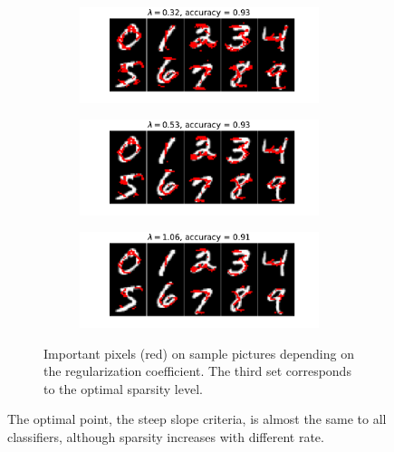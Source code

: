 \documentclass{article}
\begin{document}
\begin{figure}[t!]
\begin{subfigure}[t!]{0.40\textwidth}
\begin{subfigure}{\textwidth}
        \end{subfigure}
        \begin{subfigure}{\textwidth}
            \centering
            \includegraphics[width=\textwidth]{images/pixels_with_background_1}
        \end{subfigure}
        \begin{subfigure}{\textwidth}
            \centering
            \includegraphics[width=\textwidth]{images/pixels_with_background_2}
        \end{subfigure}
        \begin{subfigure}{\textwidth}
            \centering
            \includegraphics[width=\textwidth]{images/pixels_with_background_3}
        \end{subfigure}
        \caption{Important pixels (red) on sample pictures depending on the regularization coefficient. The third set corresponds to the optimal sparsity level.}
    \end{subfigure}
    \caption{The optimal point, the steep slope criteria, is almost the same to all classifiers, although sparsity increases with different rate.}
\end{figure}
\end{document}
